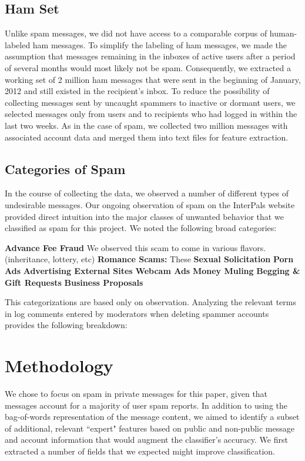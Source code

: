 \documentclass[preprint]{acm_proc_article-sp}
\begin{document}
\subsection{Ham Set}

Unlike spam messages, we did not have access to a comparable corpus of human-labeled ham messages. To simplify the labeling of ham messages, we made the assumption that messages remaining in the inboxes of active users after a period of several months would most likely not be spam. Consequently, we extracted a working set of 2 million ham messages that were sent in the beginning of January, 2012 and still existed in the recipient's inbox. To reduce the possibility of collecting messages sent by uncaught spammers to inactive or dormant users, we selected messages only from users and to recipients who had logged in within the last two weeks. As in the case of spam, we collected two million messages with associated account data and merged them into text files for feature extraction.

\subsection{Categories of Spam}

In the course of collecting the data, we observed a number of different types of undesirable messages. Our ongoing observation of spam on the InterPals website provided direct intuition into the major classes of unwanted behavior that we classified as spam for this project. We noted the following broad categories:

\textbf{Advance Fee Fraud} We observed this scam to come in various flavors.  (inheritance, lottery,  etc)
\textbf{Romance Scams:} These 
\textbf{Sexual Solicitation}
\textbf{Porn Ads}
\textbf{Advertising External Sites}
\textbf{Webcam Ads}
\textbf{Money Muling}
\textbf{Begging \& Gift Requests}
\textbf{Business Proposals}


This categorizations are based only on observation. Analyzing the relevant terms in log comments entered by moderators when deleting spammer accounts provides the following breakdown:


\section{Methodology}

We chose to focus on spam in private messages for this paper, given that messages account for a majority of user spam reports. In addition to using the bag-of-words representation of the message content, we aimed to identify a subset of additional, relevant ``expert" features based on public and non-public message and account information that would augment the classifier's accuracy. We first extracted a number of fields that we expected might improve classification. 
\end{document}
